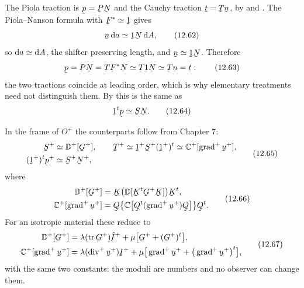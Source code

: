 The Piola traction is $\bp=\bP\bN$ and the Cauchy traction $\bt=\bT\bn$,
by  and . The Piola--Nanson formula  with
$\bF^{*}\simeq\shift$ gives
\begin{equation}
   \bn\,\dl a\simeq\shift\bN\,\dl A ,
   \tag{12.62}\label{eq:12.62}
\end{equation}
so $\mathrm{d} a\simeq\mathrm{d} A$, the shifter preserving length, and
$\bn\simeq\shift\bN$. Therefore
\begin{equation}
   \bp=\bP\bN=\bT\bF^{*}\bN\simeq\bT\shift\bN\simeq\bT\bn=\bt :
   \tag{12.63}\label{eq:12.63}
\end{equation}
the two tractions coincide at leading order, which is why elementary
treatments need not distinguish them. By  this is the same
as
\begin{equation}
   \shift^{t}\bp\simeq\bS\bN .
   \tag{12.64}\label{eq:12.64}
\end{equation}

In the frame of $O^{+}$ the counterparts follow from Chapter 7:
\begin{equation}
\begin{aligned}
   \bS^{+}&\simeq\mathbb{D}^{+}[\bG^{+}],\qquad
   \bT^{+}\simeq\shift^{+}\bS^{+}(\shift^{+})^{t}
   \simeq\mathbb{C}^{+}[\grad^{+}\bu^{+}],\\
   (\shift^{+})^{t}\bp^{+}&\simeq\bS^{+}\bN^{+},
\end{aligned}
   \tag{12.65}\label{eq:12.65}
\end{equation}
where
\begin{equation}
\begin{aligned}
   \mathbb{D}^{+}[\bG^{+}]&=\bK\big(\mathbb{D}[\bK^{t}\bG^{+}\bK]\big)
   \bK^{t},\\
   \mathbb{C}^{+}[\grad^{+}\bu^{+}]
   &=\bQ\big\{\mathbb{C}\big[\bQ^{t}(\grad^{+}\bu^{+})\bQ\big]\big\}
   \bQ^{t}.
\end{aligned}
   \tag{12.66}\label{eq:12.66}
\end{equation}
For an isotropic material these reduce to
\begin{equation}
\begin{aligned}
   \mathbb{D}^{+}[\bG^{+}]
   &=\lambda(\tr\bG^{+})\hI^{+}+\mu\big[\bG^{+}+(\bG^{+})^{t}\big],\\
   \mathbb{C}^{+}[\grad^{+}\bu^{+}]
   &=\lambda(\dvg^{+}\bu^{+})\I^{+}
   +\mu\big[\grad^{+}\bu^{+}+\big(\grad^{+}\bu^{+}\big)^{t}\big],
\end{aligned}
   \tag{12.67}\label{eq:12.67}
\end{equation}
with the same two constants: the moduli are numbers and no observer can
change them.

